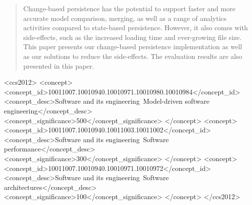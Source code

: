 \documentclass[sigplan,review,anonymous]{acmart}\settopmatter{printfolios=true,printccs=false,printacmref=false}
\begin{document}


\begin{abstract}
Change-based persistence has the potential to support faster and more accurate model comparison, merging, as well as a range of analytics activities compared to state-based persistence. However, it also comes with side-effects, such as the increased loading time and ever-growing file size. This paper presents our change-based persistence implementation as well as our solutions to reduce the side-effects. The evaluation results are also presented in this paper. 
\end{abstract}


\begin{CCSXML}
    <ccs2012>
    <concept>
    <concept_id>10011007.10010940.10010971.10010980.10010984</concept_id>
    <concept_desc>Software and its engineering~Model-driven software engineering</concept_desc>
    <concept_significance>500</concept_significance>
    </concept>
    <concept>
    <concept_id>10011007.10010940.10011003.10011002</concept_id>
    <concept_desc>Software and its engineering~Software performance</concept_desc>
    <concept_significance>300</concept_significance>
    </concept>
    <concept>
    <concept_id>10011007.10010940.10010971.10010972</concept_id>
    <concept_desc>Software and its engineering~Software architectures</concept_desc>
    <concept_significance>100</concept_significance>
    </concept>
    </ccs2012>
\end{CCSXML}
\end{document}
